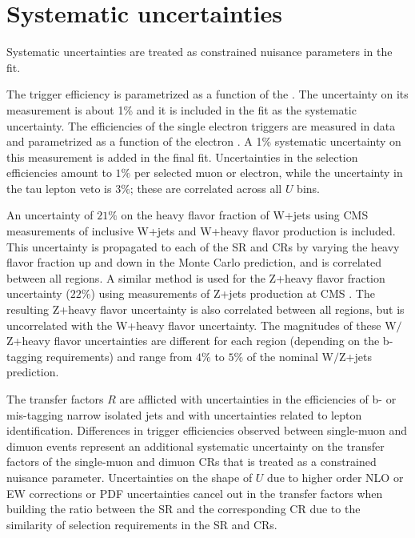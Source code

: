 \section{Systematic uncertainties}\label{sec:systematics}

Systematic uncertainties are treated as constrained nuisance
parameters in the fit.

The \MET trigger efficiency is parametrized as a function of the \MET. The uncertainty on its measurement is about 1\% and it is included in the fit as the systematic uncertainty.
The efficiencies of the single electron triggers are measured in data and parametrized as a function of the electron \pt. A 1\% systematic uncertainty on this measurement is added in the final fit.
%
Uncertainties in the selection efficiencies amount to $1\%$ per selected muon or electron, while the uncertainty in the tau lepton veto is $3\%$; these are correlated across all $U$ bins.

An uncertainty of $21\%$ on the heavy flavor fraction of
W+jets using CMS measurements of inclusive W+jets
\cite{Khachatryan:2014uva} and W+heavy flavor
\cite{Khachatryan:2014uva,Chatrchyan:2013uza} production is included. This
uncertainty is propagated to each of the SR and CRs by
varying the heavy flavor fraction up and down in the Monte Carlo
prediction, and is correlated between all regions. 
%
%
A similar method is used for the Z+heavy flavor fraction uncertainty ($22\%$) using measurements of Z+jets production at CMS \cite{Khachatryan:2014zya,Chatrchyan:2014dha}. 
%
The resulting Z+heavy flavor uncertainty is also correlated between all regions, but is uncorrelated with the W+heavy flavor uncertainty. 
%
The magnitudes of these W$/$Z+heavy flavor uncertainties are different for each region (depending on the b-tagging requirements) and range from $4\%$ to $5\%$ of the nominal W$/$Z+jets prediction.
%


The transfer factors $R$ are afflicted with uncertainties in the efficiencies of b- or mis-tagging narrow isolated jets and with uncertainties related to lepton identification.  Differences in \MET trigger efficiencies observed between single-muon and dimuon events represent an additional systematic uncertainty on the transfer factors of the single-muon and dimuon CRs that is treated as a constrained nuisance parameter. Uncertainties on the shape of $U$ due to higher order NLO or EW corrections or PDF uncertainties cancel out in the transfer factors when building the ratio between the SR and the corresponding CR due to the similarity of selection requirements in the SR and CRs.

